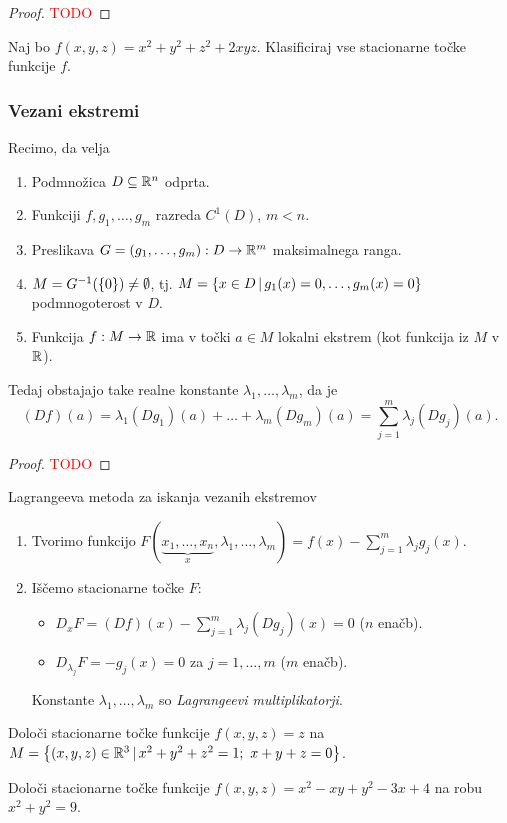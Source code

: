 \begin{proof}
    \textcolor{red}{TODO}
\end{proof}

\begin{zgled}
    Naj bo $f(x,y,z) = x^2+y^2+z^2 + 2xyz$. Klasificiraj vse stacionarne točke funkcije $f$.
\end{zgled}

\subsubsection{Vezani ekstremi}
\begin{izrek}
    Recimo, da velja
    \begin{enumerate}
        \item Podmnožica $D \subseteq \mathbb{R}^n$ odprta.
        \item Funkciji $f, g_1, \ldots, g_m$ razreda $C^1(D)$, $m < n$.
        \item Preslikava $G = (g_1, \ldots, g_m): D \to \mathbb{R}^m$ maksimalnega ranga.
        \item $M = G^{-1}(\left\{0\right\}) \neq \emptyset$, tj. $M = \left\{x \in D \,|\, g_1(x) = 0, \ldots, g_m(x) = 0\right\}$ podmnogoterost v $D$.
        \item Funkcija $f: M \to \mathbb{R}$ ima v točki $a \in M$ lokalni ekstrem (kot funkcija iz $M$ v $\mathbb{R}$).        
    \end{enumerate}
    Tedaj obstajajo take realne konstante $\lambda_1, \ldots, \lambda_m$, da je 
    $$(Df)(a) = \lambda_1 (Dg_1)(a) + \ldots + \lambda_m (Dg_m)(a) = \sum_{j=1}^{m}\lambda_j(Dg_j)(a).$$ 
\end{izrek}

\begin{proof}
    \textcolor{red}{TODO}
\end{proof}

\begin{opomba}
    Lagrangeeva metoda za iskanja vezanih ekstremov
    \begin{enumerate}
        \item Tvorimo funkcijo $F(\underbrace{x_1, \ldots, x_n}_x, \lambda_1, \ldots, \lambda_m) = f(x) - \sum_{j=1}^{m} \lambda_j g_j(x)$.
        \item Iščemo stacionarne točke $F$:
        \begin{itemize}
            \item $D_xF = (Df)(x) - \sum_{j=1}^{m}\lambda_j(Dg_j)(x) = 0$ ($n$ enačb).
            \item $D_{\lambda_j}F = -g_j(x) = 0$ za $j = 1, \ldots, m$ ($m$ enačb).
        \end{itemize}
        Konstante $\lambda_1, \ldots, \lambda_m$ so \emph{Lagrangeevi multiplikatorji}.
    \end{enumerate}    
\end{opomba}

\begin{zgled}
    Določi stacionarne točke funkcije $f(x,y,z)=z$ na $M = \left\{(x,y,z) \in \mathbb{R}^3 \,|\, x^2+y^2+z^2=1; \ x+ y + z = 0\right\}$.
\end{zgled}

\begin{zgled}
    Določi stacionarne točke funkcije $f(x,y,z)= x^2 - xy +y^2 - 3x +4$ na robu $x^2 + y^2 = 9$.
\end{zgled}